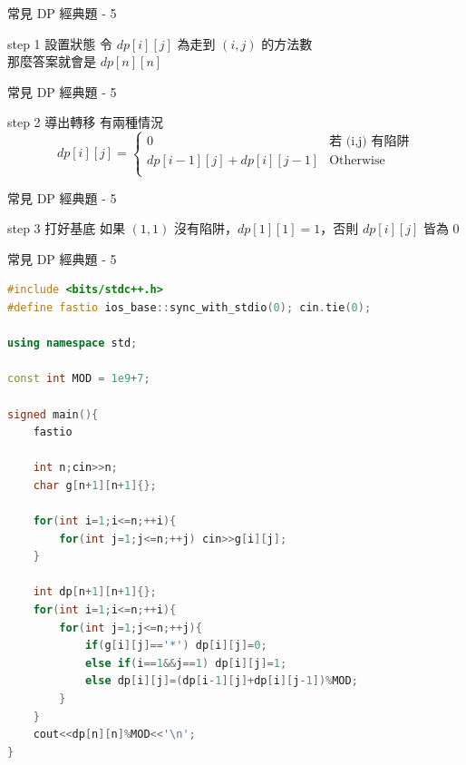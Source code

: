 \documentclass[aspectratio=169]{beamer}
\begin{document}
    \begin{frame}{常見 DP 經典題 - 5}
        \begin{alertblock}{step 1 設置狀態}
            令 $dp[i][j]$ 為走到 $(i, j)$ 的方法數 \\
            \vspace{2mm}
            那麼答案就會是 $dp[n][n]$
        \end{alertblock}
    \end{frame}
    \begin{frame}{常見 DP 經典題 - 5}
        \begin{block}{step 2 導出轉移}
            有兩種情況
            $$
            dp[i][j]= 
            \begin{cases}
                0 & \text{若 (i,j) 有陷阱} \\
                dp[i-1][j] + dp[i][j-1]           & \text{Otherwise} \\
            \end{cases}
            $$
        \end{block}
    \end{frame}  
    \begin{frame}{常見 DP 經典題 - 5}
        \begin{block}{step 3 打好基底}
            如果 $(1,1)$ 沒有陷阱，$dp[1][1]=1$，否則 $dp[i][j]$ 皆為 $0$
        \end{block}
    \end{frame}

    \begin{frame}[fragile]{常見 DP 經典題 - 5}
        \begin{lstlisting}[language=C++, basicstyle=\ttfamily\tiny]
#include <bits/stdc++.h>
#define fastio ios_base::sync_with_stdio(0); cin.tie(0);

using namespace std;

const int MOD = 1e9+7;

signed main(){
    fastio

    int n;cin>>n;
    char g[n+1][n+1]{};

    for(int i=1;i<=n;++i){
        for(int j=1;j<=n;++j) cin>>g[i][j];
    }
    
    int dp[n+1][n+1]{};
    for(int i=1;i<=n;++i){
        for(int j=1;j<=n;++j){
            if(g[i][j]=='*') dp[i][j]=0;
            else if(i==1&&j==1) dp[i][j]=1;
            else dp[i][j]=(dp[i-1][j]+dp[i][j-1])%MOD;
        }
    }
    cout<<dp[n][n]%MOD<<'\n';
}
        \end{lstlisting}
    \end{frame}
\end{document}
